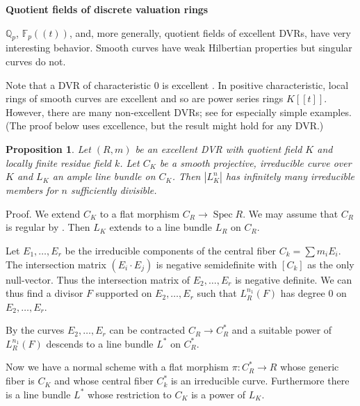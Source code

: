 \documentclass{amsart}
\newtheorem{prop}[thm]{Proposition}
\theoremstyle{definition}
\theoremstyle{remark}
\newcommand{\f}[0]{{\mathbb F}}
\newcommand{\q}[0]{{\mathbb Q}}
\newcommand{\qtq}[1]{\quad\mbox{#1}\quad}
\newcommand{\spec}[0]{\operatorname{Spec}}
\newcommand{\tsum}[0]{\textstyle{\sum}}
\begin{document}



\medskip
{\bf Quotient fields of discrete valuation rings}
\medskip

$\q_p$, $\f_p((t))$, and, more generally, quotient fields of excellent DVRs, have very interesting behavior.  Smooth curves have weak Hilbertian properties but singular curves do not. 

Note that a DVR   of  characteristic 0 is excellent   \cite[07QW]{stacks-project}. In positive characteristic,  local rings of smooth curves are excellent and so are power series rings $K[[t]]$. However, 
there are many non-excellent DVRs; see
\cite{dat-smi} for especially simple examples.
(The proof below uses excellence, but the result might hold for any DVR.)


\begin{prop} \label{hens.wH.res.f.lf.thm}
Let  $(R,m)$ be an excellent  DVR with quotient field $K$ and  locally finite residue field $k$.   Let $C_K$ be a smooth projective, irreducible curve over $K$ and $L_K$ an ample line bundle on $C_K$. Then $|L_K^n|$ has infinitely  many irreducible members for  $n$ sufficiently divisible.
\end{prop}





Proof. We extend $C_K$  to a flat morphism $C_R\to \spec R$. We may assume that $C_R$ is regular by \cite{shaf-MR0217068}. Then $L_K$ extends to a line bundle $L_R$ on $C_R$. 

 Let $E_1,\dots, E_r$ be the irreducible components of the central fiber  $C_k=\tsum m_i E_i$.  The intersection matrix
$(E_i\cdot E_j)$ is negative semidefinite with 
$[C_k]$ as the only null-vector. Thus the intersection matrix of
$E_2,\dots, E_r$ is negative definite. We can thus find a divisor
$F$ supported on $E_2,\dots, E_r$ such that  $L^{n_1}_R(F)$ has degree 0
on $E_2,\dots, E_r$. 

By \cite{Artin62}  the curves $E_2,\dots, E_r$ can be contracted 
$C_R\to C_R^*$ and
a suitable power of $L^{n_1}_R(F)$ descends to a line bundle $L^*$ on $C_R^*$.

Now we have a normal scheme with a flat morphism
$\pi:C_R^*\to R$ whose generic fiber is $C_K$ and whose central fiber  $C^*_k$ is an irreducible curve.    Furthermore there is a line bundle $L^*$
whose restriction to $C_K$ is a power of $L_K$.
\end{document}
